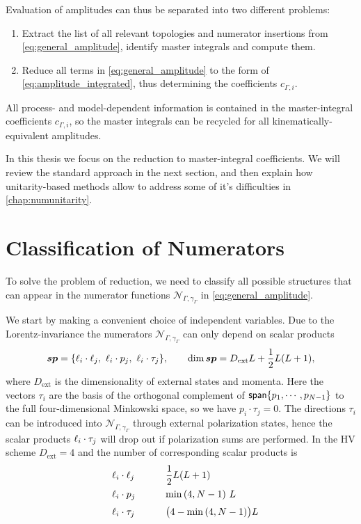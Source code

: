 Evaluation of amplitudes can thus be separated into two different problems:
\begin{enumerate}
  \item Extract the list of all relevant topologies and numerator insertions from \cref{eq:general_amplitude},
    identify master integrals and compute them.
  \item Reduce all terms in \cref{eq:general_amplitude} to the form of \cref{eq:amplitude_integrated}, thus
    determining the coefficients $c_{\Gamma,i}$.
\end{enumerate}
All process- and model-dependent information is contained in the master-integral coefficients $c_{\Gamma,i}$,
so the master integrals can be recycled for all kinematically-equivalent amplitudes.

In this thesis we focus on the reduction to master-integral coefficients.
We will review the standard approach in the next section, and
then explain how unitarity-based methods allow to address some of it's difficulties in \cref{chap:numunitarity}.

\section{Classification of Numerators}
\label{sec:classification_numerators}

To solve the problem of reduction,
we need to classify all possible structures that can appear in the numerator functions $\mathcal{N}_{\Gamma,\gamma_\Gamma}$ in \cref{eq:general_amplitude}.

We start by making a convenient choice of independent variables.
Due to the Lorentz-invariance the numerators $\mathcal{N}_{\Gamma,\gamma_\Gamma}$ can only depend on scalar products
\begin{equation}
  \label{eq:sps_all}
  \vb*{sp} = \{ \sp(\ell_i,\ell_j),~\sp(\ell_i,p_j),~\sp(\ell_i, \tau_j) \}, \qquad \dim{\vb*{sp}} = D_{\text{ext}} L + \frac{1}{2}L(L+1),
\end{equation}
where $D_{\text{ext}}$ is the dimensionality of external states and momenta.
Here the vectors $\tau_i$ are the basis of the orthogonal complement of $\mathsf{span}\{p_1,\cdots,p_{N-1}\}$ to the full four-dimensional Minkowski space,
so we have $p_i \cdot \tau_j = 0$.
The directions $\tau_i$ can be introduced into $\mathcal{N}_{\Gamma,\gamma_\Gamma}$ through external polarization states, hence
the scalar products $\sp(\ell_i, \tau_j)$ will drop out if polarization sums are performed.
In the HV scheme $D_{\text{ext}}=4$ and the number of corresponding scalar products is
\begin{equation}
  \label{eq:sp_counts}
  \renewcommand{\arraystretch}{1.5}
  \begin{tabular}[h]{p{10ex} p{20ex}}
       $\sp(\ell_i,\ell_j)$  &   $\dfrac{1}{2}L(L+1)$                \\
        $\sp(\ell_i,p_j)$    &   $\min\qty(4,N-1) ~L$                  \\
       $\sp(\ell_i, \tau_j)$ &   $ \qty\big(4-\min\qty(4,N-1)) L $  \\
  \end{tabular}
\end{equation}

